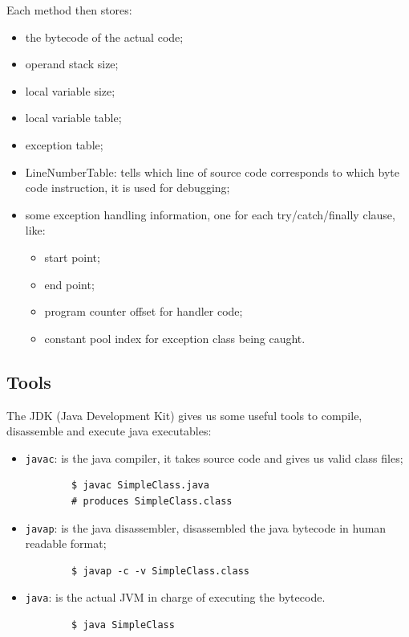 Each method then stores:
\begin{itemize}
    \item the bytecode of the actual code;
    \item operand stack size;
    \item local variable size;
    \item local variable table;
    \item exception table;
    \item LineNumberTable: tells which line of source code corresponds to which byte code instruction, it is used for debugging;
    \item some exception handling information, one for each try/catch/finally clause, like:
    \begin{itemize}
        \item start point;
        \item end point;
        \item program counter offset for handler code;
        \item constant pool index for exception class being caught.
    \end{itemize}
\end{itemize}

\subsection{Tools}
The JDK (Java Development Kit) gives us some useful tools to compile, disassemble and execute java executables:
\begin{itemize}
    \item \verb|javac|: is the java compiler, it takes source code and gives us valid class files;
    \begin{verbatim}
        $ javac SimpleClass.java
        # produces SimpleClass.class
    \end{verbatim}
    \item \verb|javap|: is the java disassembler, disassembled the java bytecode in human readable format;
    \begin{verbatim}
        $ javap -c -v SimpleClass.class
    \end{verbatim}
    \item \verb|java|: is the actual JVM in charge of executing the bytecode.
    \begin{verbatim}
        $ java SimpleClass
    \end{verbatim}
\end{itemize}

